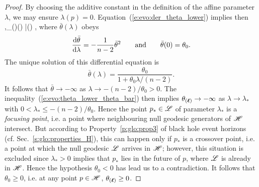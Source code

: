 \begin{proof}
By choosing the additive constant in the definition of the affine parameter $\lambda$,
we may ensure $\lambda(p) = 0$.
Equation~(\ref{e:evo:der_theta_lower}) implies then
\be \label{e:evo:theta_lower_theta_bar}
 \forall \lambda{},\quad \theta_{(\wl)}(\lambda) \leq \bar\theta(\lambda) ,
\ee
where $\bar\theta(\lambda)$ obeys
\[
    \frac{\mathrm{d}\bar\theta}{\mathrm{d}\lambda} = -  \frac{1}{n-2}  \bar\theta^2
    \qquad\mbox{and}\qquad \bar\theta(0) = \theta_0 .
\]
The unique solution of this differential equation is
\[
\bar\theta(\lambda) = \frac{\theta_0}{1 + \theta_0\lambda/(n-2)} .
\]
It follows that $\bar\theta \to -\infty$ as $\lambda \to -(n-2)/\theta_0 > 0$.
The inequality~(\ref{e:evo:theta_lower_theta_bar}) then implies
$\theta_{(\bm{\ell})} \to -\infty$ as $\lambda \to \lambda_*$
with $0 < \lambda_* \leq -(n-2)/\theta_0$. Hence the point $p_*\in\mathscr{L}$ of parameter $\lambda_*$ is a \emph{focusing point},
i.e. a point where neighbouring null geodesic generators of $\mathscr{H}$ intersect.
But according to Property~\ref{p:glo:prop3} of black hole event horizons (cf. Sec.~\ref{s:glo:properties_H}), this can happen
only if $p_*$ is a crossover point, i.e.
a point at which the null geodesic $\mathscr{L}$ arrives in $\mathscr{H}$; however,
this situation is excluded since $\lambda_* > 0$ implies that $p_*$ lies in the
future of $p$, where $\mathscr{L}$ is already in $\mathscr{H}$. Hence the hypothesis
$\theta_0 < 0$ has lead us to a contradiction. It follows that $\theta_0 \geq 0$,
i.e. at any point $p\in\mathscr{H}$,  $\theta_{(\bm{\ell})} \geq 0$.
\end{proof}

